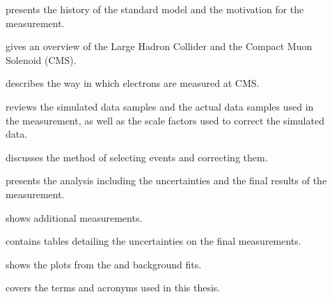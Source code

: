 \begin{description}

    \item[] presents the history of the standard
        model and the motivation for the measurement.

    \item[] gives an overview of the Large
        Hadron Collider and the Compact Muon Solenoid (CMS).

    \item[] describes the way in which
        electrons are measured at CMS.

    \item[] reviews the simulated data
        samples and the actual data samples used in the measurement, as well as
        the scale factors used to correct the simulated data.

    \item[] discusses the method of
        selecting events and correcting them.

    \item[] presents the analysis including the
        uncertainties and the final results of the measurement.

    \item[] shows additional
        measurements.

    \item[] contains tables detailing the
        uncertainties on the final measurements.

    \item[] shows the plots from the \QCDjets
        and \wjets background fits.

    \item[] covers the terms and acronyms used in
        this thesis.

\end{description}
